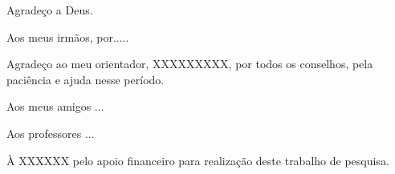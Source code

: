 \begin{agradecimentos}

Agradeço a Deus.\\

Aos meus irmãos, por.....

Agradeço ao meu orientador, XXXXXXXXX, por todos os conselhos, pela paciência e ajuda nesse período.

Aos meus amigos ...

Aos professores ...

À XXXXXX pelo apoio financeiro para realização deste trabalho de pesquisa.

\end{agradecimentos}
